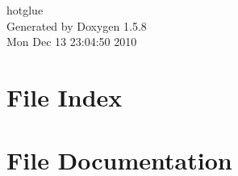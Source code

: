 \documentclass[a4paper]{book}
\begin{document}
\begin{titlepage}
\vspace*{7cm}
\begin{center}
{\Large hotglue }\\
\vspace*{1cm}
{\large Generated by Doxygen 1.5.8}\\
\vspace*{0.5cm}
{\small Mon Dec 13 23:04:50 2010}\\
\end{center}
\end{titlepage}
\clearemptydoublepage
{}
\tableofcontents
\clearemptydoublepage
{}
\chapter{File Index}

\chapter{File Documentation}






















\printindex
\end{document}
